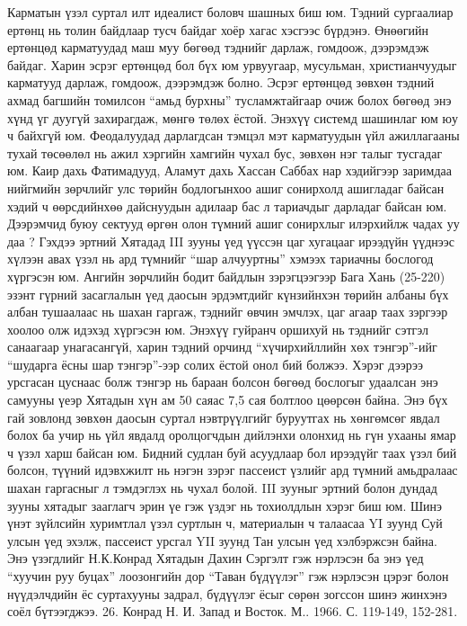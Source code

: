 Карматын үзэл суртал илт идеалист боловч шашных биш юм. Тэдний сургаалиар ертөнц нь толин байдлаар тусч байдаг хоёр хагас хэсгээс бүрдэнэ. Өнөөгийн ертөнцөд карматуудад маш муу бөгөөд тэднийг дарлаж, гомдоож, дээрэмдэж байдаг. Харин эсрэг ертөнцөд бол бүх юм урвуугаар, мусульман, христианчуудыг карматууд дарлаж, гомдоож, дээрэмдэж болно. Эсрэг ертөнцөд зөвхөн тэдний ахмад багшийн томилсон “амьд бурхны” тусламжтайгаар очиж болох бөгөөд энэ хүнд үг дуугүй захирагдаж, мөнгө төлөх ёстой. Энэхүү системд шашинлаг юм юу ч байхгүй юм. Феодалуудад дарлагдсан тэмцэл мэт карматуудын үйл ажиллагааны тухай төсөөлөл нь ажил хэргийн хамгийн чухал бус, зөвхөн нэг талыг тусгадаг юм. Каир дахь Фатимадууд, Аламут дахь Хассан Саббах нар хэдийгээр заримдаа нийгмийн зөрчлийг улс төрийн бодлогынхоо ашиг сонирхолд ашигладаг байсан хэдий ч өөрсдийнхөө дайснуудын адилаар бас л тариачдыг дарладаг байсан юм. Дээрэмчид буюу сектууд өргөн олон түмний ашиг сонирхлыг илэрхийлж чадах уу даа ?
Гэхдээ эртний Хятадад III зууны үед үүссэн цаг хугацааг ирээдүйн үүднээс хүлээн авах үзэл нь ард түмнийг “шар алчууртны” хэмээх тариачны бослогод хүргэсэн юм. Ангийн зөрчлийн бодит байдлын зэрэгцээгээр Бага Хань (25-220) эзэнт гүрний засаглалын үед даосын эрдэмтдийг күнзийнхэн төрийн албаны бүх албан тушаалаас нь шахан гаргаж, тэднийг өвчин эмчлэх, цаг агаар таах зэргээр хоолоо олж идэхэд хүргэсэн юм. Энэхүү гуйранч оршихуй нь тэднийг сэтгэл санаагаар унагасангүй, харин тэдний орчинд “хүчирхийллийн хөх тэнгэр”-ийг “шударга ёсны шар тэнгэр”-ээр солих ёстой онол бий болжээ. Хэрэг дээрээ урсгасан цуснаас болж тэнгэр нь бараан болсон бөгөөд бослогыг удаалсан энэ самууны үеэр Хятадын хүн ам 50 саяас 7,5 сая болтлоо цөөрсөн байна. Энэ бүх гай зовлонд зөвхөн даосын суртал нэвтрүүлгийг буруутгах нь хөнгөмсөг явдал болох ба учир нь үйл явдалд оролцогчдын дийлэнхи олонхид нь гүн ухааны ямар ч үзэл харш байсан юм. Бидний судлан буй асуудлаар бол ирээдүйг таах үзэл бий болсон, түүний идэвхжилт нь нэгэн зэрэг пассеист үзлийг ард түмний амьдралаас шахан гаргасныг л тэмдэглэх нь чухал болой. III зууныг эртний болон дундад зууны хятадыг зааглагч эрин үе гэж үздэг нь тохиолдлын хэрэг биш юм. Шинэ үнэт зүйлсийн хуримтлал үзэл суртлын ч, материалын ч талаасаа YI зуунд Суй улсын үед эхэлж, пассеист урсгал YII зуунд Тан улсын үед хэлбэржсэн байна. Энэ үзэгдлийг Н.К.Конрад Хятадын Дахин Сэргэлт гэж нэрлэсэн ба энэ үед “хуучин руу буцах” лоозонгийн дор “Таван бүдүүлэг” гэж нэрлэсэн цэрэг болон нүүдэлчдийн ёс суртахууны задрал, бүдүүлэг ёсыг сөрөн зогссон шинэ жинхэнэ соёл бүтээгджээ. 26. Конрад Н. И. Запад и Восток. М.. 1966. С. 119-149, 152-281.
